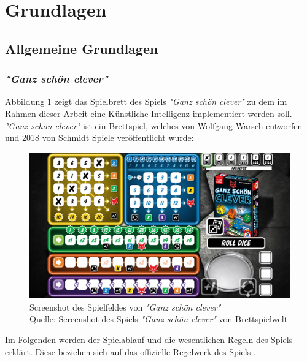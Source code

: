 \section{Grundlagen}
\subsection{Allgemeine Grundlagen}
\subsubsection{\textit{"Ganz schön clever"}}
	Abbildung 1 zeigt das Spielbrett des Spiels \textit{"Ganz schön clever"} zu dem im Rahmen dieser Arbeit eine Künstliche Intelligenz implementiert werden soll. \textit{"Ganz schön clever"} ist ein Brettspiel, welches von Wolfgang Warsch entworfen und 2018 von Schmidt Spiele veröffentlicht wurde:
	\nopagebreak
\begin{figure}[H]
	\includegraphics[width=1\textwidth]{Bilder/gsc} 
	\caption[Screenshot des Spielfeldes von \textit{"Ganz schön clever"}]{Screenshot des Spielfeldes von \textit{"Ganz schön clever"}\\ Quelle: Screenshot des Spiels \textit{"Ganz schön clever"} von Brettspielwelt}
\end{figure}

Im Folgenden werden der Spielablauf und die wesentlichen Regeln des Spiels erklärt. Diese beziehen sich auf das offizielle Regelwerk des Spiels \cite{schmidtspiele_ganzschonclever}.

